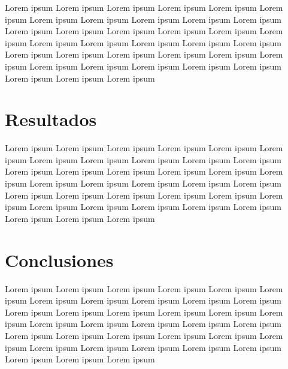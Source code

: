 \documentclass[12pt]{article}
\begin{document}
Lorem ipsum Lorem ipsum Lorem ipsum Lorem ipsum Lorem ipsum Lorem ipsum Lorem ipsum Lorem ipsum Lorem ipsum Lorem ipsum Lorem ipsum Lorem ipsum Lorem ipsum Lorem ipsum Lorem ipsum Lorem ipsum Lorem ipsum Lorem ipsum Lorem ipsum Lorem ipsum Lorem ipsum Lorem ipsum Lorem ipsum Lorem ipsum Lorem ipsum Lorem ipsum Lorem ipsum Lorem ipsum Lorem ipsum Lorem ipsum Lorem ipsum Lorem ipsum Lorem ipsum Lorem ipsum Lorem ipsum Lorem ipsum

\section{Resultados}

Lorem ipsum Lorem ipsum Lorem ipsum Lorem ipsum Lorem ipsum Lorem ipsum Lorem ipsum Lorem ipsum Lorem ipsum Lorem ipsum Lorem ipsum Lorem ipsum Lorem ipsum Lorem ipsum Lorem ipsum Lorem ipsum Lorem ipsum Lorem ipsum Lorem ipsum Lorem ipsum Lorem ipsum Lorem ipsum Lorem ipsum Lorem ipsum Lorem ipsum Lorem ipsum Lorem ipsum Lorem ipsum Lorem ipsum Lorem ipsum Lorem ipsum Lorem ipsum Lorem ipsum Lorem ipsum Lorem ipsum Lorem ipsum

\section{Conclusiones}

Lorem ipsum Lorem ipsum Lorem ipsum Lorem ipsum Lorem ipsum Lorem ipsum Lorem ipsum Lorem ipsum Lorem ipsum Lorem ipsum Lorem ipsum Lorem ipsum Lorem ipsum Lorem ipsum Lorem ipsum Lorem ipsum Lorem ipsum Lorem ipsum Lorem ipsum Lorem ipsum Lorem ipsum Lorem ipsum Lorem ipsum Lorem ipsum Lorem ipsum Lorem ipsum Lorem ipsum Lorem ipsum Lorem ipsum Lorem ipsum Lorem ipsum Lorem ipsum Lorem ipsum Lorem ipsum Lorem ipsum Lorem ipsum

 
 


\end{document}

